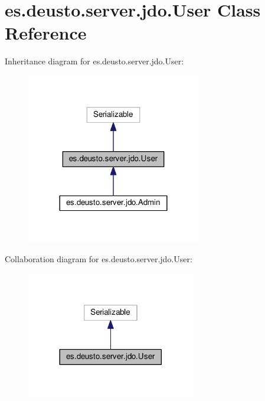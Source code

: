 \hypertarget{classes_1_1deusto_1_1server_1_1jdo_1_1_user}{}\section{es.\+deusto.\+server.\+jdo.\+User Class Reference}
\label{classes_1_1deusto_1_1server_1_1jdo_1_1_user}


Inheritance diagram for es.\+deusto.\+server.\+jdo.\+User\+:
\nopagebreak
\begin{figure}[H]
\begin{center}
\leavevmode
\includegraphics[width=216pt]{classes_1_1deusto_1_1server_1_1jdo_1_1_user__inherit__graph}
\end{center}
\end{figure}


Collaboration diagram for es.\+deusto.\+server.\+jdo.\+User\+:
\nopagebreak
\begin{figure}[H]
\begin{center}
\leavevmode
\includegraphics[width=209pt]{classes_1_1deusto_1_1server_1_1jdo_1_1_user__coll__graph}
\end{center}
\end{figure}
